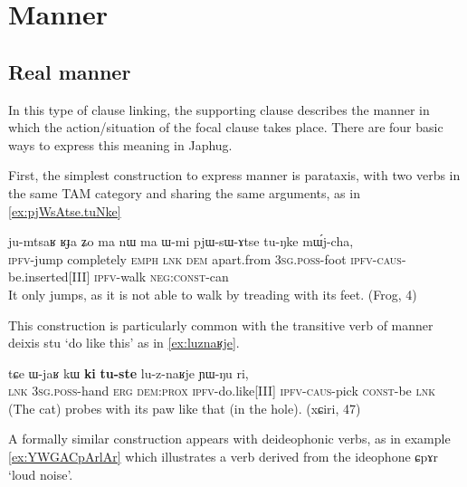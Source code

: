 \documentclass[oldfontcommands,oneside,a4paper,11pt]{article}
\newcommand{\ipa}[1]{{\phon \mbox{#1}}} %
\begin{document}
%
% 
	 
	 

\section{Manner} \label{sec:manner}

 
\subsection{Real manner}
In this type of clause linking, the supporting clause describes the manner in which the action/situation of the focal clause takes place. There are four basic ways to express this meaning in Japhug.

First, the simplest construction to express manner is  parataxis, with    two verbs  in the same TAM category and sharing the same arguments, as in \ref{ex:pjWsAtse.tuNke}

\begin{exe}
\ex \label{ex:pjWsAtse.tuNke}
\gll
\ipa{ju-mtsaʁ} 	\ipa{ʁɟa} 	\ipa{ʑo} 	\ipa{ma} 	\ipa{nɯ} 	\ipa{ma} 	\ipa{ɯ-mi} 	\ipa{pjɯ-sɯ-ɤtse} 	\ipa{tu-ŋke} 	\ipa{mɯ́j-cha,} \\
\textsc{ipfv}-jump completely \textsc{emph} \textsc{lnk} \textsc{dem} apart.from \textsc{3sg.poss}-foot \textsc{ipfv-caus}-be.inserted[III] \textsc{ipfv}-walk \textsc{neg:const}-can \\
\glt It only jumps, as it is not able to walk by treading with its feet.  (Frog, 4)
\end{exe}

This construction is particularly common with the transitive verb of manner deixis \ipa{stu} `do like this' as in \ref{ex:luznaʁje}.

\begin{exe}
\ex \label{ex:luznaʁje}
\gll
\ipa{tɕe} 	\ipa{ɯ-jaʁ} 	\ipa{kɯ} 	\ipa{\textbf{ki}} 	\ipa{\textbf{tu-ste}} 	\ipa{lu-z-naʁje} 	\ipa{ɲɯ-ŋu} 	\ipa{ri,} \\
\textsc{lnk} \textsc{3sg.poss}-hand \textsc{erg} \textsc{dem:prox} \textsc{ipfv}-do.like[III] \textsc{ipfv-caus}-pick \textsc{const}-be \textsc{lnk} \\
\glt (The cat) probes with its paw like that (in the hole). (xɕiri, 47)
\end{exe}
A formally similar construction appears with deideophonic verbs, as in example \ref{ex:YWGACpArlAr} which illustrates a   verb derived from the ideophone \ipa{ɕpɤr} `loud noise'.  
\end{document}
